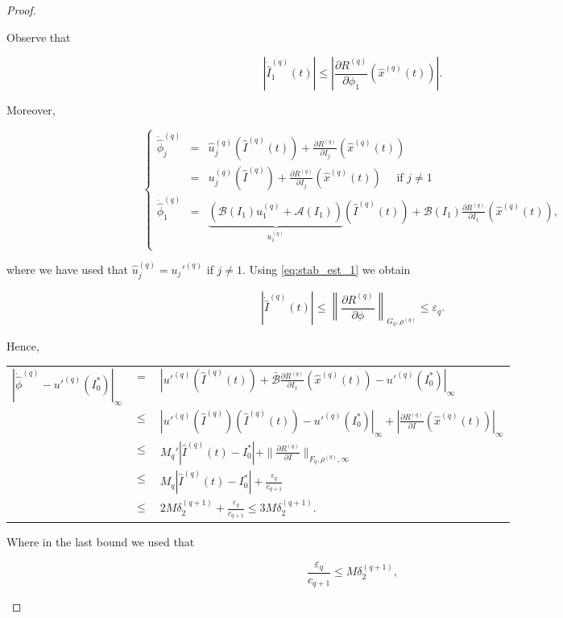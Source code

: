 \begin{proof}
\begin{enumerate}
Observe that

\begin{equation}\label{eq:stab_est_1}
|\dot{\hat I}_1^{(q)}(t)| \leq \left|\frac{\partial R^{(q)}}{\partial \phi_1}(\hat x^{(q)}(t))\right|.
\end{equation}

Moreover,


$$
\left\{
\begin{array}{rcl}
 \dot{\hat \phi}_j^{(q)} & = & \hat{u}_j^{(q)}(\hat I^{(q)}(t)) + \frac{\partial R^{(q)}}{\partial I_j}(\hat x^{(q)}(t)) \\ 
 &=& u_j^{(q)}(\hat I^{(q)}) + \frac{\partial R^{(q)}}{\partial I_j}(\hat x^{(q)}(t)) \quad \text{ if }  j \neq 1 \\
 \dot{\hat{\phi}}_1^{(q)} & = & \underbrace{(\mathcal{B}(I_1)u_1^{(q)} + \mathcal{A}(I_1))}_{u_1^{(q)}}(\hat I^{(q)}(t)) + \mathcal{B}(I_1)\frac{\partial R^{(q)}}{\partial I_1}(\hat x^{(q)}(t)), \\
\end{array}
\right.
$$

where we have used that $\hat u_j^{(q)} = u_j'^{(q)}$ if $j \neq 1$.
Using \ref{eq:stab_est_1} we obtain

$$|\dot{\hat I}^{(q)}(t)| \leq \left\|\frac{\partial R^{(q)}}{\partial \phi}\right\|_{G_q,\rho^{(q)}} \leq \varepsilon_q.$$

Hence,

\begin{longtable}{rcl}
 $|\dot{\hat \phi}^{(q)} - u'^{(q)}(I_0^*)|_\infty$ & $=$ & $|u'^{(q)}(\hat I^{(q)}(t)) + \bar{\mathcal{B}}\frac{\partial R^{(q)}}{\partial I_1}(\hat x^{(q)}(t)) - u'^{(q)}(I_0^*)|_\infty$\\
 & $\leq $ & $|u'^{(q)}(\hat I ^{(q)})(\hat I^{(q)}(t)) - u'^{(q)}(I_0^* )|_\infty + |\frac{\partial R^{(q)}}{\partial I}(\hat x^{(q)}(t))|_\infty$\\
 & $\leq$ & $M_q'|\hat I^{(q)}(t) - I_0^*| + \|\frac{\partial R^{(q)}}{\partial I}\|_{F_q, \rho^{(q)},\infty}$\\
 & $\leq$ & $M_q|\hat I^{(q)}(t) - I_0^*| + \frac{\varepsilon_q}{c_{q+1}}$\\
 & $\leq$ & $2M\delta_2^{(q+1)} + \frac{\varepsilon_q}{c_{q+1}} \leq 3M\delta_2^{(q+1)}.$\\
\end{longtable}
Where in the last bound we used that

\begin{equation}\label{eq:sta_est_2}
\frac{\varepsilon_q}{c_{q+1}} \leq M \delta_2^{(q+1)},
\end{equation}


\end{enumerate}
\end{proof}
